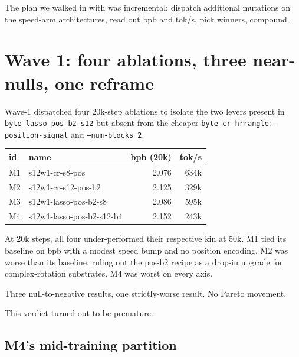 The plan we walked in with was incremental: dispatch additional mutations on the speed-arm architectures, read out bpb and tok/s, pick winners, compound.

\section{Wave 1: four ablations, three near-nulls, one reframe}

Wave-1 dispatched four 20k-step ablations to isolate the two levers present in \texttt{byte-lasso-pos-b2-s12} but absent from the cheaper \texttt{byte-cr-hrrangle}: \texttt{--position-signal} and \texttt{--num-blocks 2}.

\begin{center}
\begin{tabular}{llrr}
\toprule
id & name & bpb (20k) & tok/s \\
\midrule
M1 & s12w1-cr-s8-pos        & 2.076 & 634k \\
M2 & s12w1-cr-s12-pos-b2    & 2.125 & 329k \\
M3 & s12w1-lasso-pos-b2-s8  & 2.086 & 595k \\
M4 & s12w1-lasso-pos-b2-s12-b4 & 2.152 & 243k \\
\bottomrule
\end{tabular}
\end{center}

At 20k steps, all four under-performed their respective kin at 50k. M1 tied its baseline on bpb with a modest speed bump and no position encoding. M2 was worse than its baseline, ruling out the pos-b2 recipe as a drop-in upgrade for complex-rotation substrates. M4 was worst on every axis.

\begin{result}
Three null-to-negative results, one strictly-worse result. No Pareto movement.
\end{result}

This verdict turned out to be premature.

\subsection{M4's mid-training partition}

